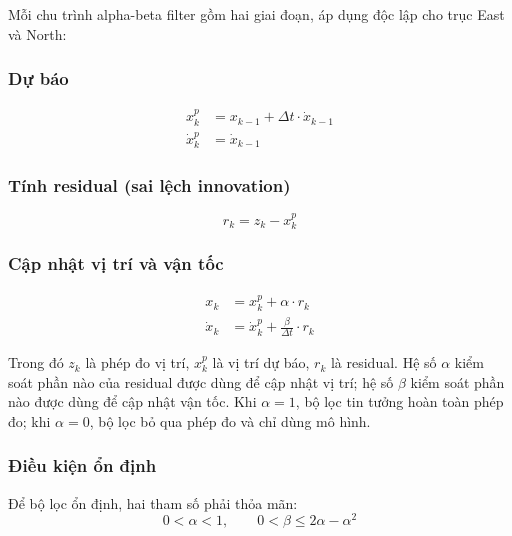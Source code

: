 \hspace{0.5cm} Mỗi chu trình alpha-beta filter gồm hai giai đoạn, áp dụng độc lập cho trục East và North:

\subsubsection{Dự báo\\}
\begin{equation}
\begin{aligned}
    x_k^p &= x_{k-1} + \Delta t \cdot \dot{x}_{k-1} \\
    \dot{x}_k^p &= \dot{x}_{k-1}
\end{aligned}
\end{equation}

\subsubsection{Tính residual (sai lệch innovation)\\}
\begin{equation}
    r_k = z_k - x_k^p
\end{equation}

\subsubsection{Cập nhật vị trí và vận tốc\\}
\begin{equation}
\begin{aligned}
    x_k &= x_k^p + \alpha \cdot r_k \\
    \dot{x}_k &= \dot{x}_k^p + \frac{\beta}{\Delta t} \cdot r_k
\end{aligned}
\end{equation}

Trong đó $z_k$ là phép đo vị trí, $x_k^p$ là vị trí dự báo, $r_k$ là residual. Hệ số $\alpha$ kiểm soát phần nào của residual được dùng để cập nhật vị trí; hệ số $\beta$ kiểm soát phần nào được dùng để cập nhật vận tốc. Khi $\alpha = 1$, bộ lọc tin tưởng hoàn toàn phép đo; khi $\alpha = 0$, bộ lọc bỏ qua phép đo và chỉ dùng mô hình.

\subsubsection{Điều kiện ổn định}

\hspace{0.5cm} Để bộ lọc ổn định, hai tham số phải thỏa mãn:
\begin{equation}
    0 < \alpha < 1, \qquad 0 < \beta \leq 2\alpha - \alpha^2
\end{equation}

